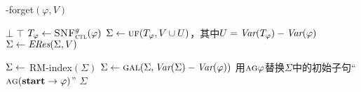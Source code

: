 \begin{algorithm}[tb]
	\caption{{\CTL-forget}$(\varphi, V)$}
	\label{alg:compute:forgetting:by:Resolution}
	\lIf{$\varphi\equiv\bot$} {{\bf \Return $\bot$}}    
	 {{\bf \Return  $\top$}}   
	$T_\varphi \leftarrow {\textsc{SNF}_{\textsc{ctl}}^g}(\varphi)$ 
	$\Sigma\leftarrow \textsc{uf}(T_\varphi,V\cup U)$，其中$U=\textit{Var}(T_\varphi)-\textit{Var}(\varphi)$
	$\Sigma\leftarrow \emph{ERes}(\Sigma,V)$ 
	
	$\Sigma\leftarrow$ {RM-index}$(\Sigma)$ 
	$\Sigma\leftarrow \textsc{gal}(\Sigma,\textit{Var}(\Sigma)-\textit{Var}(\varphi))$ 
	用$\textsc{a}\textsc{g}\varphi$替换$\Sigma$中的初始子句“$\textsc{a}\textsc{g}(\textbf{start}\rightarrow\varphi)$”\;
	\Return $\Sigma$\;
\end{algorithm}



